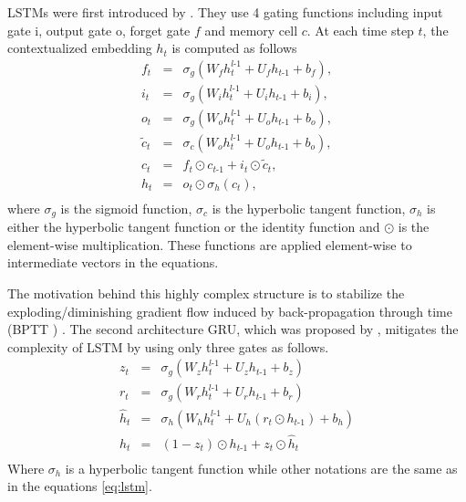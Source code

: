 LSTMs were first introduced by \citet{Hochreiter97long}. They use 4 gating functions including input gate i, output gate o, forget gate $f$ and memory cell $c$. At each time step $t$, the contextualized embedding $h_t$ is computed as follows
\begin{equation}
\label{eq:lstm}
\begin{array}{rcl}
f_t &=& \sigma_g (W_f h^{l\text{-}1}_t + U_f h_{t\text{-}1} + b_f),\\
i_t &=& \sigma_g (W_i h^{l\text{-}1}_t + U_i h_{t\text{-}1} + b_i),\\
o_t &=& \sigma_g (W_o h^{l\text{-}1}_t + U_o h_{t\text{-}1} + b_o),\\
\tilde{c}_t &=& \sigma_c (W_o h^{l\text{-}1}_t + U_o h_{t\text{-}1} + b_o),\\
c_t &=& f_t \odot c_{t\text{-}1} + i_t \odot \tilde{c}_t,\\
h_t &=& o_t \odot \sigma_h(c_t),\\
\end{array}
\end{equation}
where $\sigma_g$ is the sigmoid function, $\sigma_c$ is the hyperbolic tangent function, $\sigma_h$ is either the hyperbolic tangent function or the identity function and $\odot$ is the element-wise multiplication. These functions are applied element-wise to intermediate vectors in the equations.

The motivation behind this highly complex structure is to stabilize the exploding/diminishing gradient flow \citep{Pascanu13onthe} induced by back-propagation through time (BPTT ) \citep{Hochreiter97long}. The second architecture GRU, which was proposed by \citet{Cho14properties}, mitigates the complexity of LSTM by using only three gates as follows.
\begin{equation}
\label{eq:gru}
\begin{array}{rcl}
z_t &=& \sigma_g (W_z h^{l\text{-}1}_t + U_z h_{t\text{-}1} + b_z)\\
r_t &=& \sigma_g (W_r h^{l\text{-}1}_t + U_r h_{t\text{-}1} + b_r)\\
\hat{h}_t &=& \sigma_h (W_h h^{l\text{-}1}_t + U_h (r_t \odot h_{t\text{-}1}) + b_h)\\
h_t &=& (1-z_t)\odot h_{t\text{-}1} + z_t \odot \hat{h}_t\\
\end{array}
\end{equation}
Where $\sigma_h$ is a hyperbolic tangent function while other notations are the same as in the equations \ref{eq:lstm}.
